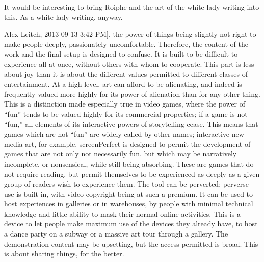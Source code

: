 It would be interesting to bring Roiphe and the art of the white lady writing into this. As a white lady writing, anyway.

Alex Leitch, 2013-09-13 3:42 PM], the power of things being slightly not-right to make people deeply, passionately uncomfortable. Therefore, the content of the work and the final setup is designed to confuse. It is built to be difficult to experience all at once, without others with whom to cooperate. This part is less about joy than it is about the different values permitted to different classes of entertainment. At  a high level, art can afford to be alienating, and indeed is frequently valued more highly for its power of alienation than for any other thing. This is a distinction made especially true in video games, where the power of “fun” tends to be valued highly for its commercial properties; if a game is not “fun,” all elements of its interactive powers of storytelling cease. This means that games which are not “fun” are widely called by other names; interactive new media art, for example. 
screenPerfect is designed to permit the development of games that are not only not necessarily fun, but which may be narratively incomplete, or nonsensical, while still being absorbing. These are games that do not require reading, but permit themselves to be experienced as deeply as a given group of readers wish to experience them. The tool can be perverted; perverse use is built in, with video copyright being at such a premium. It can be used to host experiences in galleries or in warehouses, by people with minimal technical knowledge and little ability to mask their normal online activities. This is a device to let people make maximum use of the devices they already have, to host a dance party on a subway or a massive art tour through a gallery. The demonstration content may be upsetting, but the access permitted is broad. This is about sharing things, for the better.